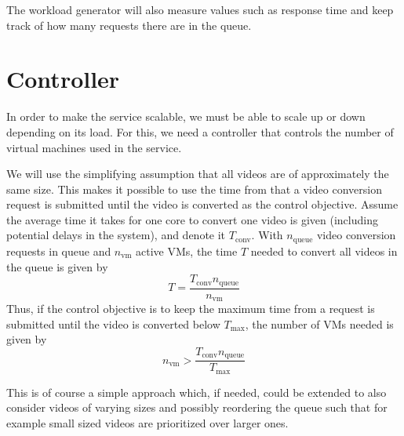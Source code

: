 \documentclass[a4paper, 10pt, english]{article}
\begin{document}
The workload generator will also measure values such as response time and keep track of how many requests there are in the queue.
\section{Controller}
In order to make the service scalable, we must be able to scale up or down depending on its load. For this, we need a controller that controls the number of virtual machines used in the service.

We will use the simplifying assumption that all videos are of approximately the same size. This makes it possible to use the time from that a video conversion request is submitted until the video is converted as the control objective. Assume the average time it takes for one core to convert one video is given (including potential delays in the system), and denote it $ T_{\text{conv}} $. With $ n_{\text{queue}} $ video conversion requests in queue and $ n_{\text{vm}} $ active VMs, the time $ T $ needed to convert all videos in the queue is given by
\begin{equation}
T = \frac{T_{\text{conv}}  n_{\text{queue}}}{n_{\text{vm}}}
\end{equation}
Thus, if the control objective is to keep the maximum time from a request is submitted until the video is converted below $ T_{\text{max}} $, the number of VMs needed is given by
\begin{equation}
n_{\text{vm}} > \frac{T_{\text{conv}}  n_{\text{queue}}}{T_{\text{max}}}
\end{equation}

This is of course a simple approach which, if needed, could be extended to also consider videos of varying sizes and possibly reordering the queue such that for example small sized videos are prioritized over larger ones.
\end{document}
